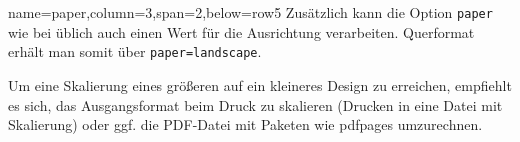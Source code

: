 \documentclass[
	accentcolor=9c,
	]{tudasciposter}
\let\code\texttt
\let\pck\textsf
\begin{document}
\begin{tcbposter}[
		poster={
			columns=4,
			rows=7,
			spacing=1cm,
		},]
\begin{posterboxenv}[title=Papierformat]{name=paper,column=3,span=2,below=row5}
		Zusätzlich kann die Option \code{paper} wie bei \KOMAScript{} üblich auch einen Wert für die Ausrichtung verarbeiten. Querformat erhält man somit über \code{paper=landscape}.

		Um eine Skalierung eines größeren auf ein kleineres Design zu erreichen, empfiehlt es sich, das Ausgangsformat beim Druck zu skalieren (Drucken in eine Datei mit Skalierung) oder ggf. die PDF-Datei mit Paketen wie \pck{pdfpages} umzurechnen.
	\end{posterboxenv}

\end{tcbposter}
\end{document}
